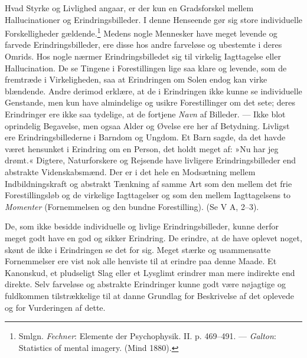\documentclass[12pt,a4paper,openany]{book}
\newcommand{\opage}[1]{\marginnote{\footnotesize\textit{[#1]}}}
\begin{document}
Hvad Styrke og Livlighed angaar, er der kun en Gradsforskel mellem
Hallucinationer og Erindringsbilleder. I denne Henseende gør sig store
individuelle Forskelligheder gældende.\footnote[1]{Smlgn.
\emph{Fechner}: Elemente der Psychophysik. II. p. 469--491. ---
\emph{Galton}: Statistics of mental imagery. (Mind 1880).} Medens nogle
Mennesker have meget levende og farvede Erindringsbilleder, ere disse
hos andre farveløse og ubestemte i deres Omrids. Hos nogle nærmer
Erindringsbilledet sig til virkelig Iagttagelse eller Hallucination. De
se Tingene i Forestillingen lige saa klare og levende, som de fremtræde
i Virkeligheden, saa at Erindringen om Solen endog kan virke blændende.
Andre derimod erklære, at de i Erindringen ikke kunne se individuelle
Genstande, men kun have almindelige og usikre Forestillinger om det
sete; deres Erindringer ere ikke saa tydelige, at de fortjene
\emph{Navn} af Billeder. --- Ikke blot oprindelig Begavelse, men ogsaa
Alder og Øvelse ere her af Betydning. Livligst ere Erindringsbillederne
i Barndom og Ungdom. Et Barn sagde, da det havde været hensunket i
Erindring om en Person, det holdt meget af: »Nu har jeg drømt.« Digtere,
Naturforskere og Rejsende have livligere Erindringsbilleder end
abstrakte Videnskabsmænd. Der er i det hele en Modsætning mellem
Indbildningskraft og abstrakt Tænkning af samme Art som den mellem det
frie Forestillingsløb og de virkelige Iagttagelser og som den mellem
Iagttagelsens to \emph{Momenter} (Fornemmelsen og den bundne
Forestilling). (Se V A, 2--3).


\opage{179}De, som ikke besidde individuelle og livlige
Erindringsbilleder, kunne derfor meget godt have en god og sikker
Erindring. De erindre, at de have oplevet noget, skønt de ikke i
Erindringen se det for sig. Meget stærke og usammensatte Fornemmelser
ere vist nok alle henviste til at erindre paa denne Maade. Et Kanonskud,
et pludseligt Slag eller et Lysglimt erindrer man mere indirekte end
direkte. Selv farveløse og abstrakte Erindringer kunne godt være
nøjagtige og fuldkommen tilstrækkelige til at danne Grundlag for
Beskrivelse af det oplevede og for Vurderingen af dette.
\end{document}

